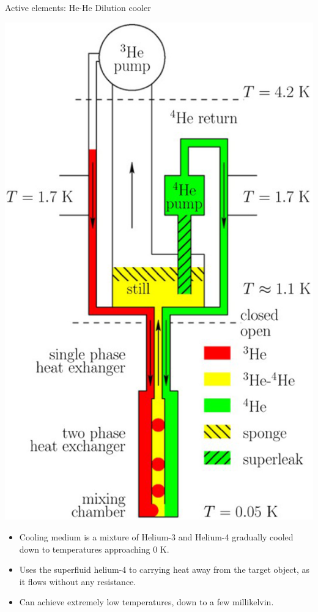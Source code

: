 \begin{frame}{Active elements: He-He Dilution cooler}

    \begin{minipage}{0.3\textwidth}
            \includegraphics[width=0.8\linewidth]{Figures/He_He_dilution_diag.png} 

    \end{minipage}
    \begin{minipage}{0.65\textwidth}
    \begin{itemize}
        \item Cooling medium is a mixture of Helium-3 and Helium-4 gradually cooled down to temperatures approaching 0 K. 
        \item Uses the superfluid helium-4 to carrying heat away from the target object, as it flows without any resistance.
        \item Can achieve extremely low temperatures, down to a few millikelvin.
    \end{itemize}
    \end{minipage}

\end{frame}
